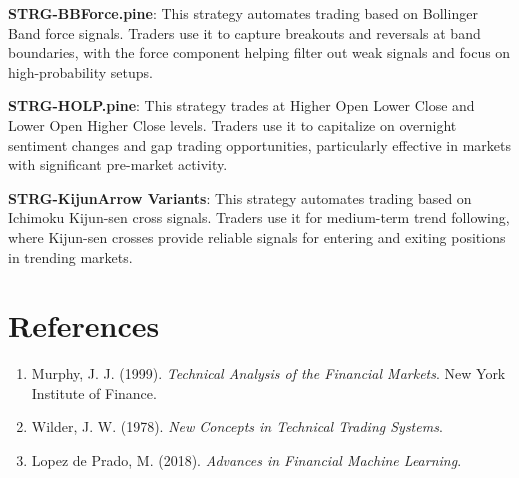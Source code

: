 \documentclass[12pt]{article}
\begin{document}
\textbf{STRG-BBForce.pine}: This strategy automates trading based on Bollinger Band force signals. Traders use it to capture breakouts and reversals at band boundaries, with the force component helping filter out weak signals and focus on high-probability setups.

\textbf{STRG-HOLP.pine}: This strategy trades at Higher Open Lower Close and Lower Open Higher Close levels. Traders use it to capitalize on overnight sentiment changes and gap trading opportunities, particularly effective in markets with significant pre-market activity.

\textbf{STRG-KijunArrow Variants}: This strategy automates trading based on Ichimoku Kijun-sen cross signals. Traders use it for medium-term trend following, where Kijun-sen crosses provide reliable signals for entering and exiting positions in trending markets.

\section{References}
\label{sec:references}
\begin{enumerate}
\item Murphy, J. J. (1999). \textit{Technical Analysis of the Financial Markets}. New York Institute of Finance.
\item Wilder, J. W. (1978). \textit{New Concepts in Technical Trading Systems}.
\item Lopez de Prado, M. (2018). \textit{Advances in Financial Machine Learning}.
\end{enumerate}
\end{document}
